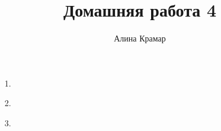 \documentclass{article}
\begin{document}
\title{Домашняя работа 4}
\author{Алина Крамар}

\maketitle
\begin{enumerate}

\item[1.]
\item[2.]
\item[3.]

\end{enumerate}
\end{document}
